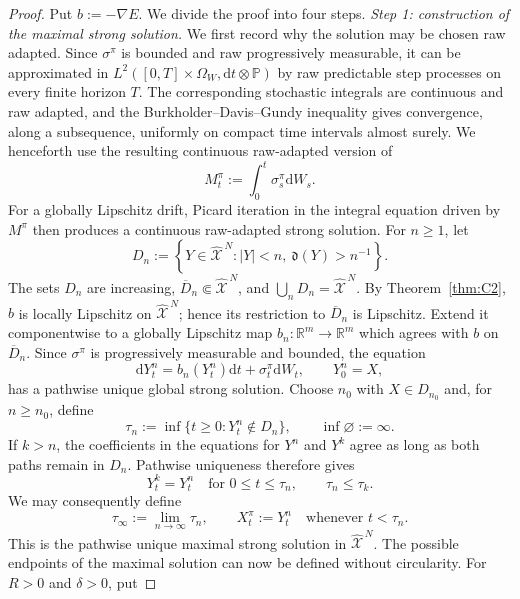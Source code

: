 \documentclass[11pt]{article}
\def\P{\mathbb{P}}
\def\R{\mathbb{R}}
\def\Xc{{\mathcal X}}
\def\hX{\widehat{\Xc}^{\,N}}
\newcommand{\dd}{\mathrm{d}}
\theoremstyle{definition}
\theoremstyle{remark}
\numberwithin{equation}{section}
\begin{document}
\begin{proof}
Put $b:=-\nabla E$.  We divide the proof into four steps.
\medskip
\noindent\textit{Step 1: construction of the maximal strong solution.}
We first record why the solution may be chosen raw adapted.  Since
$\sigma^\pi$ is bounded and raw progressively measurable, it can be approximated in
$L^2([0,T]\times\Omega_W,\dd t\otimes\P)$ by raw predictable step processes on every finite horizon $T$.
The corresponding stochastic integrals are continuous and raw adapted, and the
Burkholder--Davis--Gundy inequality gives convergence, along a subsequence, uniformly on
compact time intervals almost surely.  We henceforth use the resulting continuous raw-adapted
version of
\[
 M_t^\pi:=\int_0^t\sigma_s^\pi\dd W_s.
\]
For a globally Lipschitz drift, Picard iteration in the integral equation driven by $M^\pi$
then produces a continuous raw-adapted strong solution.
For $n\ge1$, let
\begin{equation}\label{eq:exhaustion-controlled-dynamics}
 D_n:=\left\{Y\in\hX:|Y|<n,\ \mathfrak d(Y)>n^{-1}\right\}.
\end{equation}
The sets $D_n$ are increasing, $\overline D_n\Subset\hX$, and
$\bigcup_nD_n=\hX$.  By Theorem~\ref{thm:C2}, $b$ is locally Lipschitz on $\hX$; hence its
restriction to $\overline D_n$ is Lipschitz.  Extend it componentwise to a globally Lipschitz map
$b_n:\R^m\to\R^m$ which agrees with $b$ on $\overline D_n$.  Since $\sigma^\pi$ is progressively
measurable and bounded, the equation
\begin{equation}\label{eq:extended-SDE-controlled}
 \dd Y_t^n=b_n(Y_t^n)\dd t+\sigma_t^\pi\dd W_t,
 \qquad Y_0^n=X,
\end{equation}
has a pathwise unique global strong solution.  Choose $n_0$ with $X\in D_{n_0}$ and, for
$n\ge n_0$, define
\[
 \tau_n:=\inf\{t\ge0:Y_t^n\notin D_n\},
 \qquad \inf\varnothing:=\infty.
\]
If $k>n$, the coefficients in the equations for $Y^n$ and $Y^k$ agree as long as both paths remain
in $D_n$.  Pathwise uniqueness therefore gives
\[
 Y_t^k=Y_t^n\quad\text{for }0\le t\le\tau_n,
 \qquad
 \tau_n\le\tau_k.
\]
We may consequently define
\begin{equation}\label{eq:maximal-controlled-solution}
 \tau_\infty:=\lim_{n\to\infty}\tau_n,
 \qquad
 X_t^\pi:=Y_t^n\quad\text{whenever }t<\tau_n.
\end{equation}
This is the pathwise unique maximal strong solution in $\hX$.
The possible endpoints of the maximal solution can now be defined without circularity.  For
$R>0$ and $\delta>0$, put

\end{proof}
\end{document}
